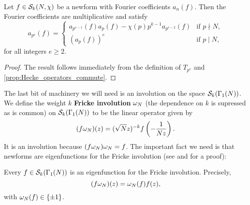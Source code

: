       \begin{proposition}\label{prop:newform_Fourier_coefficient_recurrence}
        Let $f \in \mathcal{S}_{k}(N,\chi)$ be a newform with Fourier coefficients $a_{n}(f)$. Then the Fourier coefficients are multiplicative and satisfy
        \[
          a_{p^{e}}(f) = \begin{cases} a_{p^{e-1}}(f)a_{p}(f)-\chi(p)p^{k-1}a_{p^{e-2}}(f) & \text{if $p \nmid N$}, \\ (a_{p}(f))^{e} & \text{if $p \mid N$}, \end{cases}
        \]
        for all integers $e \ge 2$.
      \end{proposition}
      \begin{proof}
        The result follows immediately from the definition of $T_{p^{e}}$ and \cref{prop:Hecke_operators_commute}.
      \end{proof}
      
      The last bit of machinery we will need is an involution on the space $\mathcal{S}_{k}(\Gamma_{1}(N))$. We define the weight $k$ \textbf{Fricke involution} $\omega_{N}$ (the dependence on $k$ is supressed as is common) on $\mathcal{S}_{k}(\Gamma_{1}(N))$ to be the linear operator given by
      \[
        (f\omega_{N})(z) = (\sqrt{N}z)^{-k}f\left(-\frac{1}{Nz}\right).
      \]
      It is an involution because $(f\omega_{N})\omega_{N} = f$. The important fact we need is that newforms are eigenfunctions for the Fricke involution (see \cite{miyake2006modular} and \cite{diamond2005first} for a proof):

      \begin{proposition}\label{prop:Fricke_involution_preserves_subspaces}
        Every $f \in \mathcal{S}_{k}(\Gamma_{1}(N))$ is an eigenfunction for the Fricke involution. Precisely,
        \[
          (f\omega_{N})(z) = \omega_{N}(f)f(z),
        \]
        with $\omega_{N}(f) \in \{\pm1\}$.
      \end{proposition}
